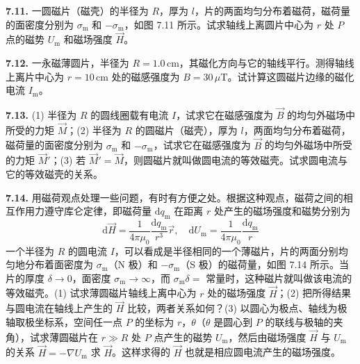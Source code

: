 \vfill
\newpage

\textbf{7.11.} 一圆磁片（磁壳）的半径为 $R$，厚为 $l$，片的两面均匀分布着磁荷，磁荷量的面密度分别为 $\sigma_{\mathrm{m}}$ 和 $-\sigma_{\mathrm{m}}$，如图 7.11 所示。试求轴线上离圆片中心为 $r$ 处 $P$ 点的磁势 $U_{\mathrm{m}}$ 和磁场强度 $\vec{H}$。

\begin{center}
  \begin{minipage}[b]{0.47\linewidth}
    \centering
  \end{minipage}\hfill
  \begin{minipage}[b]{0.47\linewidth}
    \centering
  \end{minipage}
\end{center}

\vfill
\newpage

\textbf{7.12.} 一永磁薄圆片，半径为 $R = 1.0\,\mathrm{cm}$，其磁化方向与它的轴线平行。测得轴线上离片中心为 $r = 10\,\mathrm{cm}$ 处的磁感强度为 $B = 30\,\mu\mathrm{T}$。试计算这圆磁片边缘的磁化电流 $I_{\mathrm{m}}$。

\vfill
\newpage

\textbf{7.13.} (1) 半径为 $R$ 的圆线圈载有电流 $I$，试求它在磁感强度为 $\vec{B}$ 的均匀外磁场中所受的力矩 $\vec{M}$；(2) 半径为 $R$ 的圆磁片（磁壳），厚为 $l$，两面均匀分布着磁荷，磁荷量的面密度分别为 $\sigma_{\mathrm{m}}$ 和 $-\sigma_{\mathrm{m}}$，试求它在磁感强度为 $\vec{B}$ 的均匀外磁场中所受的力矩 $\vec{M}'$；(3) 若 $\vec{M}' = \vec{M}$，则圆磁片就叫做圆电流的等效磁壳。试求圆电流与它的等效磁壳的关系。

\vfill
\newpage

\textbf{7.14.} 用磁荷观点处理一些问题，有时有方便之处。根据这种观点，磁荷之间的相互作用力遵守库仑定律，即磁荷量 $\mathrm{d}q_{\mathrm{m}}$ 在距离 $r$ 处产生的磁场强度和磁势分别为
\[
\mathrm{d}\vec{H} = \frac{1}{4\pi\mu_0} \frac{\mathrm{d}q_{\mathrm{m}}}{r^3}\vec{r}, \quad \mathrm{d}U_{\mathrm{m}} = \frac{1}{4\pi\mu_0} \frac{\mathrm{d}q_{\mathrm{m}}}{r}
\]
一个半径为 $R$ 的圆电流 $I$，可以看成是半径相同的一个薄磁片，片的两面分别均匀地分布着面密度为 $\sigma_{\mathrm{m}}$（N 极）和 $-\sigma_{\mathrm{m}}$（S 极）的磁荷量，如图 7.14 所示。当片的厚度 $\delta \to 0$，面密度 $\sigma_{\mathrm{m}} \to \infty$，而 $\sigma_{\mathrm{m}}\delta =$ 常量时，这种磁片就叫做该电流的等效磁壳。(1) 试求薄圆磁片轴线上离中心为 $r$ 处的磁场强度 $\vec{H}$；(2) 把所得结果与圆电流在轴线上产生的 $\vec{H}$ 比较，两者关系如何？(3) 以圆心为极点、轴线为极轴取极坐标系，空间任一点 $P$ 的坐标为 $r$，$\theta$（$\theta$ 是圆心到 $P$ 的联线与极轴的夹角），试求薄圆磁片在 $r \gg R$ 处 $P$ 点产生的磁势 $U_{\mathrm{m}}$，然后由磁场强度 $\vec{H}$ 与 $U_{\mathrm{m}}$ 的关系 $\vec{H} = -\nabla U_{\mathrm{m}}$ 求 $\vec{H}$。这样求得的 $\vec{H}$ 也就是相应圆电流产生的磁场强度。

